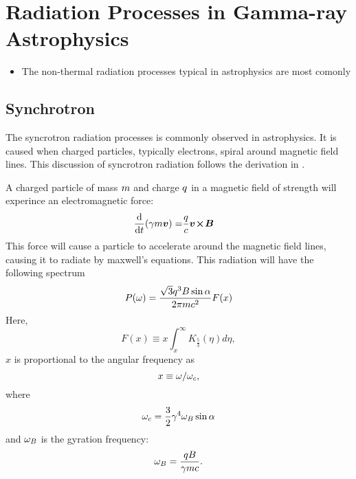 \section{Radiation Processes in Gamma-ray Astrophysics}



\begin{itemize}
  \item The non-thermal radiation processes typical
    in astrophysics are most comonly
\end{itemize}

\subsection{Synchrotron}


The syncrotron radiation processes is commonly observed
in astrophysics. It is caused when charged particles,
typically electrons, spiral around magnetic field lines.
This discussion of syncrotron radiation follows
the derivation in \cite{rybicki_1979a_radiative-processes}.

A charged particle of 
mass $m$ and charge $q$ in a magnetic field
of strength 
\MagneticFieldVector
will experince an
electromagnetic force:
\begin{align}
  \frac{\text{d}}{\text{d}t} (\gamma m \boldsymbol{v}) = & \frac{q}{c} \boldsymbol{v}\!\boldsymbol{\times}\!\boldsymbol{B}
\end{align}
This force will cause a particle to accelerate around
the magnetic field lines, causing it
to radiate by maxwell's equations.
This radiation will have the following spectrum 
\begin{equation}
  P(\omega) = \frac{\sqrt{3} q^3 B \sin\alpha}{2\pi m c^2} F(x)
\end{equation}
Here,
\begin{equation}
  F(x) \equiv x \int_x^\infty K_{\tfrac{5}{3}} (\eta) d\eta,
\end{equation}
$x$ is proportional to the angular frequency as
\begin{equation}
x \equiv \omega/\omega_c,
\end{equation}
where
\begin{equation}
\omega_c = \frac{3}{2} \gamma^4 \omega_B \sin\alpha
\end{equation}
and $\omega_B$ is the gyration frequency:
\begin{equation}
  \omega_B = \frac{qB}{\gamma m c}.
\end{equation}

